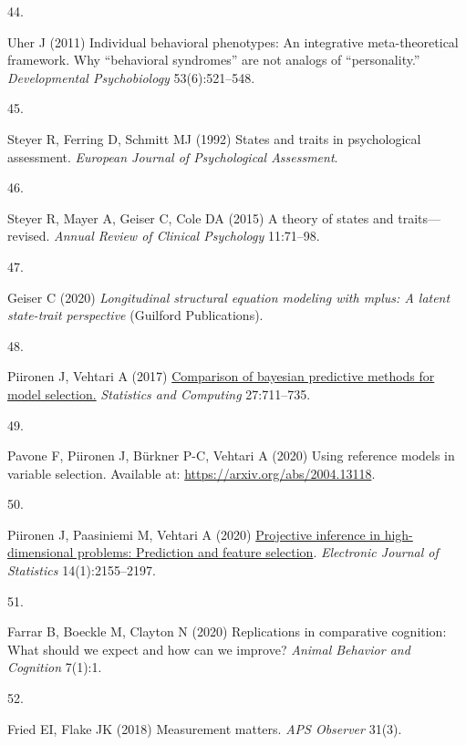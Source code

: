 \documentclass[
  man,floatsintext]{apa6}
\newlength{\cslhangindent}
\newlength{\csllabelwidth}
\newlength{\cslentryspacingunit} %
\newenvironment{CSLReferences}[2] %
 {%
  \setlength{\parindent}{0pt}
  \ifodd #1
  \let\oldpar\par
  \def\par{\hangindent=\cslhangindent\oldpar}
  \fi
  \setlength{\parskip}{#2\cslentryspacingunit}
 }%
 {}
\newcommand{\CSLLeftMargin}[1]{\parbox[t]{\csllabelwidth}{#1}}
\newcommand{\CSLRightInline}[1]{\parbox[t]{\linewidth - \csllabelwidth}{#1}\break}
\begin{document}
\begin{CSLReferences}{0}{0}
\leavevmode{}%
\CSLLeftMargin{44. }%
\CSLRightInline{Uher J (2011) Individual behavioral phenotypes: An integrative meta-theoretical framework. Why {``behavioral syndromes''} are not analogs of {``personality.''} \emph{Developmental Psychobiology} 53(6):521--548.}

\leavevmode{}%
\CSLLeftMargin{45. }%
\CSLRightInline{Steyer R, Ferring D, Schmitt MJ (1992) States and traits in psychological assessment. \emph{European Journal of Psychological Assessment}.}

\leavevmode{}%
\CSLLeftMargin{46. }%
\CSLRightInline{Steyer R, Mayer A, Geiser C, Cole DA (2015) A theory of states and traits---revised. \emph{Annual Review of Clinical Psychology} 11:71--98.}

\leavevmode{}%
\CSLLeftMargin{47. }%
\CSLRightInline{Geiser C (2020) \emph{Longitudinal structural equation modeling with mplus: A latent state-trait perspective} (Guilford Publications).}

\leavevmode{}%
\CSLLeftMargin{48. }%
\CSLRightInline{Piironen J, Vehtari A (2017) \href{https://doi.org/10.1007/s11222-016-9649-y}{Comparison of bayesian predictive methods for model selection.} \emph{Statistics and Computing} 27:711--735.}

\leavevmode{}%
\CSLLeftMargin{49. }%
\CSLRightInline{Pavone F, Piironen J, Bürkner P-C, Vehtari A (2020) Using reference models in variable selection. Available at: \url{https://arxiv.org/abs/2004.13118}.}

\leavevmode{}%
\CSLLeftMargin{50. }%
\CSLRightInline{Piironen J, Paasiniemi M, Vehtari A (2020) \href{https://doi.org/10.1214/20-EJS1711}{{Projective inference in high-dimensional problems: Prediction and feature selection}}. \emph{Electronic Journal of Statistics} 14(1):2155--2197.}

\leavevmode{}%
\CSLLeftMargin{51. }%
\CSLRightInline{Farrar B, Boeckle M, Clayton N (2020) Replications in comparative cognition: What should we expect and how can we improve? \emph{Animal Behavior and Cognition} 7(1):1.}

\leavevmode{}%
\CSLLeftMargin{52. }%
\CSLRightInline{Fried EI, Flake JK (2018) Measurement matters. \emph{APS Observer} 31(3).}


\end{CSLReferences}
\end{document}
